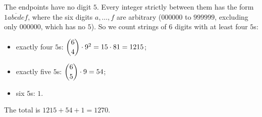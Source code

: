 The endpoints have no digit $5$. Every integer strictly between them has the form $\overline{1abcdef}$, where the six digits $a,\dots,f$ are arbitrary ($000000$ to $999999$, excluding only $000000$, which has no $5$). So we count strings of $6$ digits with at least four $5$s:
\begin{itemize}
\item exactly four $5$s: $\dbinom64\cdot9^2=15\cdot81=1215$;
\item exactly five $5$s: $\dbinom65\cdot9=54$;
\item six $5$s: $1$.
\end{itemize}
The total is $1215+54+1=\boxed{1270}$.

